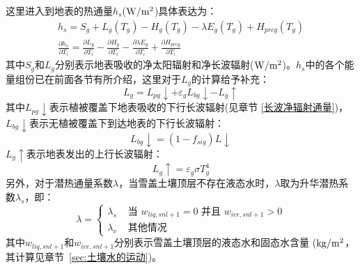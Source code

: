 这里进入到地表的热通量$h_s$($\rm W/m^2$)具体表达为：
\begin{equation}
\begin{array}{c}h_{s}=S_{g}+L_{g}\left(T_{g}\right)-H_{g}\left(T_{g}\right)-\lambda E_{g}\left(T_{g}\right)+H_{p r c g}\left(T_{g}\right) \\ \frac{\partial h_{s}}{\partial T_{i}}=\frac{\partial L_{g}}{\partial T_{i}}-\frac{\partial H_{g}}{\partial T_{i}}-\frac{\partial \lambda E_{g}}{\partial T_{i}}+\frac{\partial H_{p r c g}}{\partial T_{i}}\end{array}
\end{equation}
其中$S_g$和$L_g$分别表示地表吸收的净太阳辐射和净长波辐射($\rm W/m^2$)。$h_s$中的各个能量组份已在前面各节有所介绍，这里对于$L_g$的计算给予补充：
\begin{equation}
L_{g}=L_{p g} \downarrow+\varepsilon_{g} L_{b g} \downarrow-L_{g} \uparrow
\end{equation}
其中$L_{pg}\downarrow$表示植被覆盖下地表吸收的下行长波辐射(见章节 \ref{长波净辐射通量})，$L_{bg}\downarrow$表示无植被覆盖下到达地表的下行长波辐射：
\begin{equation}
L_{b g} \downarrow=\left(1-f_{ sig }\right) L \downarrow
\end{equation}
$L_g\uparrow$表示地表发出的上行长波辐射：
\begin{equation}
L_{g} \uparrow=\varepsilon_{g} \sigma T_{g}^{4}
\end{equation}
另外，对于潜热通量系数$\lambda$，当雪盖土壤顶层不存在液态水时，$\lambda$取为升华潜热系数$\lambda_s$，即：
\begin{equation}
\lambda=\left\{\begin{array}{lr}\lambda_{s} & \text { 当 } w_{liq, s n l+1}=0 \text { 并且 } w_{ice, s n l+1}>0 \\ \lambda_{v} & \text { 其他情况 }\end{array}\right.
\end{equation}
其中$w_{liq,snl+1}$和$w_{ice,snl+1}$分别表示雪盖土壤顶层的液态水和固态水含量 ($\rm kg/m^2$，其计算见章节~\ref{sec:土壤水的运动})。


